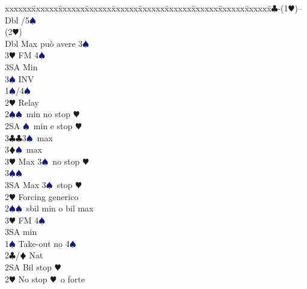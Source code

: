\documentclass[a4paper,italian]{article}
\newcommand{\BC}{\textcolor{OliveGreen}{$\clubsuit$}}
\newcommand{\BD}{\textcolor{RedOrange}{$\vardiamondsuit$}}
\newcommand{\BH}{\textcolor{Red2}{$\varheartsuit${}}}
\newcommand{\BS}{\textcolor{MidnightBlue}{$\spadesuit${}}}
\newenvironment{bidtable}
{\begin{tabbing}

    xxxxxx\=xxxxxx\=xxxxxx\=xxxxxx\=xxxxxx\=xxxxxx\=xxxxxx\=xxxxxx\=xxxxxx\=xxxxxx\=\kill}
{\end{tabbing} }%
\begin{document}
\begin{multicols}{2}
                                        \begin{bidtable}
                                            1\BC-(1\BH)--\+\\
                                            Dbl /5\BS \+\\
                                            (2\BH)\+\\
                                            Dbl \> Max può avere 3\BS \\
                                            3\BH \> FM 4\BS \+\\
                                            3SA \> Min\-\\
                                            3\BS \> INV\-\\
                                            1\BS {}/4\BS \+\\
                                            2\BH \> Relay\+\\
                                            2\BS {}\BS\ min no stop \BH \\
                                            2SA \BS\ min e stop \BH \\
                                            3\BC {}\BC 3\BS\ max\\
                                            3\BD {}\BS\ max\\
                                            3\BH \> Max 3\BS\ no stop \BH \\
                                            3\BS {}\BS \\
                                            3SA \> Max 3\BS\ stop \BH \-\-\\
                                            2\BH \> Forcing generico\\
                                            2\BS {}\BS\ sbil min o bil max\\
                                            3\BH \> FM 4\BS \+\\
                                            3SA \> min\-\-\\
                                            1\BS \> Take-out no 4\BS \\
                                            2\BC/\BD \> Nat\+\\
                                            2SA \> Bil stop \BH \\
                                            2\BH \> No stop \BH\ o forte\-\\

\end{bidtable}
\end{multicols}
\end{document}
